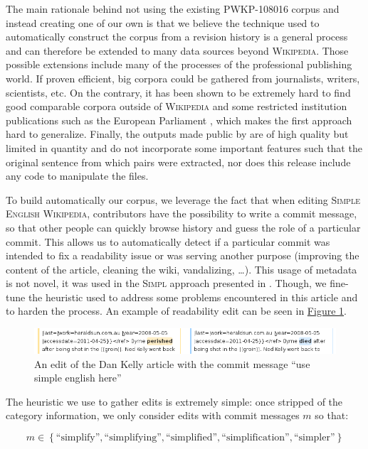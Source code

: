 \documentclass[a4paper, 11pt, onepage]{scrreprt}
\newcommand\wiki{\textsc{Wikipedia}}
\newcommand\sew{\textsc{Simple English Wikipedia}}
\newcommand\figureref[1]{\hyperref[#1]{Figure \ref*{#1}}}
\begin{document}
The main rationale behind not using the existing PWKP-108016 corpus
and instead creating one of our own is that we believe the technique
used to automatically construct the corpus from a revision history is
a general process and can therefore be extended to many data sources
beyond \wiki. Those possible extensions include many of the processes
of the professional publishing world. If proven efficient, big corpora
could be gathered from journalists, writers, scientists, etc. On the
contrary, it has been shown to be extremely hard to find good
comparable corpora outside of \wiki{} and some restricted institution
publications such as the European Parliament \cite{koehn2005europarl},
which makes the first approach hard to generalize. Finally, the
outputs made public by \cite{yatskar2010sake} are of high quality but
limited in quantity and do not incorporate some important features
such that the original sentence from which pairs were extracted, nor
does this release include any code to manipulate the files.

To build automatically our corpus, we leverage the fact that when
editing \sew, contributors have the possibility to write a commit
message, so that other people can quickly browse history and guess the
role of a particular commit. This allows us to automatically detect if
a particular commit was intended to fix a readability issue or was
serving another purpose (improving the content of the article,
cleaning the wiki, vandalizing, …). This usage of metadata is not
novel, it was used in the \textsc{Simpl} approach presented in
\cite{yatskar2010sake}. Though, we fine-tune the heuristic used to
address some problems encountered in this article and to harden the
process. An example of readability edit can be seen in
\figureref{fig:dan-kelly}.

\begin{figure}[H]
  \centering
  \includegraphics[width=\textwidth]{dan-kelly}
  \caption{An edit of the Dan Kelly article with the commit message
    “use simple english here”}
  \label{fig:dan-kelly}
\end{figure}

The heuristic we use to gather edits is extremely simple: once
stripped of the category information, we only consider edits with
commit messages $m$ so that:

\[
m \in \left\{\text{“simplify”}, \text{“simplifying”},
  \text{“simplified”}, \text{“simplification”},
  \text{“simpler”}\right\}
\]
\end{document}
